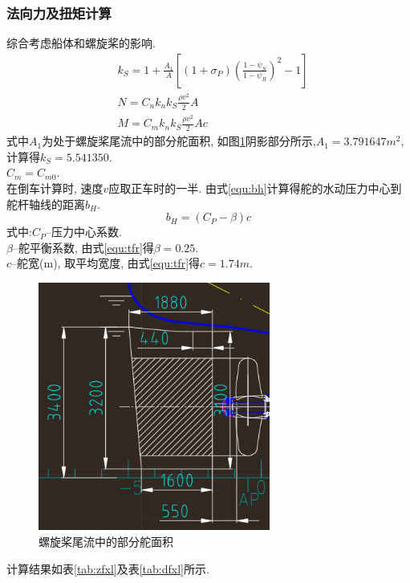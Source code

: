 \documentclass[a4paper,UTF8]{article}
\begin{document}
\subsubsection{法向力及扭矩计算}
综合考虑船体和螺旋桨的影响.
\begin{equation}
\begin{split}
&k_{S}=1+\frac{A_{1}}{A}[(1+\sigma_{P})(\frac{1-\psi_{S}}{1-{\psi_{R}}})^2-1]\\
&N = C_{n}k_{n}k_{S}\frac{\rho v^2}{2}A\\
&M = C_{m}k_{n}k_{S}\frac{\rho v^2}{2}Ac
\end{split}
\end{equation}
式中$A_{1}$为处于螺旋桨尾流中的部分舵面积, 如图\ref{fig:a1}阴影部分所示,$A_{1}=3.791647m^2$, 计算得$k_{S}=5.541350$.\\
$C_{m}=C_{m0}$.\\在倒车计算时, 速度$v$应取正车时的一半.
由式\ref{equ:bh}计算得舵的水动压力中心到舵杆轴线的距离$b_{H}$.
\begin{equation}\label{equ:bh}
	b_{H}=(C_{P}-\beta)c
\end{equation}
式中:$C_{P}$--压力中心系数.\\
$\beta$--舵平衡系数, 由式\ref{equ:tfr}得$\beta=0.25$.\\
$c$--舵宽(m), 取平均宽度, 由式\ref{equ:tfr}得$c=1.74m$.
\begin{figure}
	\centering
	\includegraphics[width=3in]{figure/area1}
	\caption{螺旋桨尾流中的部分舵面积}
	\label{fig:a1}
\end{figure}
计算结果如表\ref{tab:zfxl}及表\ref{tab:dfxl}所示.
\end{document}
